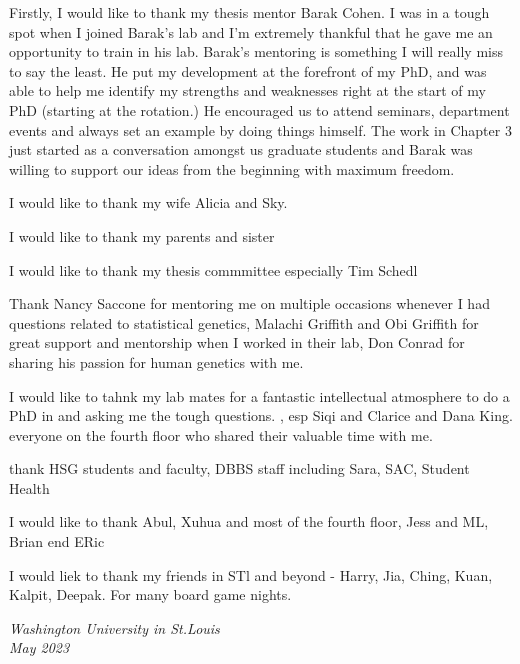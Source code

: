 \thesisacknowledgments

Firstly, I would like to thank my thesis mentor Barak Cohen. I was in a tough spot when I joined Barak's lab and I'm extremely thankful that he gave me an opportunity to train in his lab. Barak's mentoring is something I will really miss to say the least. He put my development at the forefront of my PhD, and was able to help me identify my strengths and weaknesses right at the start of my PhD (starting at the rotation.) He encouraged us to attend seminars, department events and always set an example by doing things himself. The work in Chapter 3 just started as a conversation amongst us graduate students and Barak was willing to support our ideas from the beginning with maximum freedom. 


I would like to thank my wife Alicia and Sky. 

I would like to thank my parents and sister

I would like to thank my thesis commmittee especially Tim Schedl

Thank Nancy Saccone for mentoring me on multiple occasions whenever I had questions related to statistical genetics, Malachi Griffith and Obi Griffith for great support and mentorship when I worked in their lab, Don Conrad for sharing his passion for human genetics with me.

I would like to tahnk my lab mates for a fantastic intellectual atmosphere to do a PhD in and asking me the tough questions. , esp Siqi and Clarice and Dana King. everyone on the fourth floor who shared their valuable time with me.

thank HSG students and faculty, DBBS staff including Sara, SAC, Student Health

I would like to thank Abul, Xuhua and most of the fourth floor, Jess and ML, Brian end ERic

I would liek to thank my friends in STl and beyond - Harry, Jia, Ching, Kuan, Kalpit, Deepak. For many board game nights.
 

\null\hfill \thesisauthor

\noindent
\textit{Washington University in St.\@ Louis}\\
\textit{May 2023}
